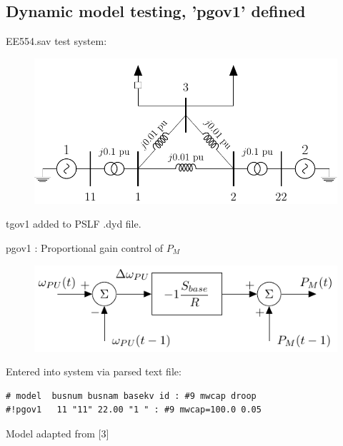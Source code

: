 \documentclass[14pt, unknownkeysallowed]{beamer}
\begin{document}
\subsection{Dynamic model testing, 'pgov1' defined}
\begin{frame}
EE554.sav test system:
\vspace{-1em}\\
\begin{figure}
	\includegraphics[width=\linewidth]{cicuitEE554}
\end{figure}
\vspace{-1em}
tgov1 added to PSLF .dyd file.
\end{frame}
\begin{frame}[fragile]
pgov1 : Proportional gain control of $P_M$ \\

\begin{figure}
	\includegraphics[width=\linewidth]{pgov1}
\end{figure}\vspace{-1em}
Entered into system via parsed text file:
\begin{lstlisting}[frame=single, basicstyle=\footnotesize]
# model  busnum busnam basekv id : #9 mwcap droop
#!pgov1   11 "11" 22.00 "1 " : #9 mwcap=100.0 0.05
\end{lstlisting}\vspace{-0.5em}
\footnotesize Model adapted from [3]
\end{frame}
\end{document}
